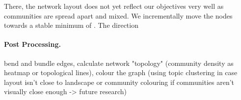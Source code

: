 There, the network layout does not yet reflect our objectives very well as communities are spread apart and mixed.
We incrementally move the nodes towards a stable minimum of .
The direction 

\paragraph{Post Processing.}
bend and bundle edges, calculate network "topology" (community density as heatmap or topological lines), colour the graph (using topic clustering in case layout isn't close to landscape or community colouring if communities aren't visually close enough -> future research)

%

